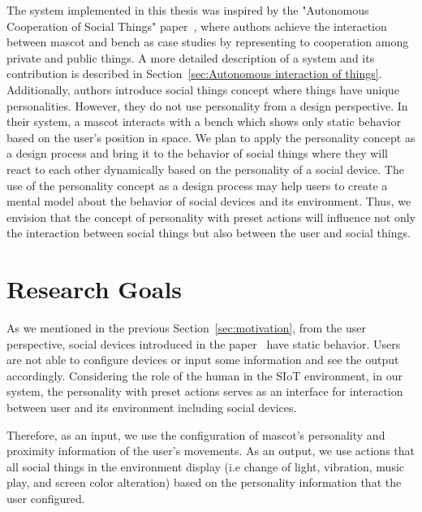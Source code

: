 The system implemented in this thesis was inspired by the "Autonomous Cooperation of Social Things"
paper~\cite{okada2016autonomous},
where authors achieve the interaction between mascot and bench as case
studies by representing to cooperation among private and public things.
A more detailed description of a system and its contribution is described
in Section~\ref{sec:Autonomous interaction of things}.
Additionally, authors introduce social things concept where things have unique personalities.
However, they do not use personality from a design perspective.
In their system, a mascot interacts with a bench which shows only static behavior based on the user's position in space.
We plan to apply the personality concept as a design process and bring it to the
behavior of social things where they will react to each other dynamically based on the personality of a social device.
The use of the personality concept as a design process may help users to
create a mental model about the behavior of social devices and its environment.
Thus, we envision that the concept of personality with preset actions will influence
not only the interaction between social things but also between the user and social things.

\section{Research Goals}
\label{sec:research-goals}
As we mentioned in the previous Section~\ref{sec:motivation}, from the user perspective, social devices introduced
in the paper~\cite{okada2016autonomous} have static behavior.
Users are not able to configure devices or input some information and see the output accordingly.
Considering the role of the human in the SIoT environment, in our system, the personality with preset
actions serves as an interface for interaction between user and its environment including social devices.

Therefore, as an input, we use the configuration of mascot's personality and proximity
information of the user's movements.
As an output, we use actions that all social things in the environment display
(i.e change of light, vibration, music play, and screen color alteration) based
on the personality information that the user configured.

